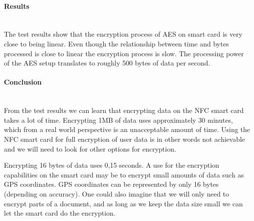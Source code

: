\paragraph{Results}\mbox{}\\



The test results show that the encryption process of AES on smart card is very close to being linear. Even though the relationship between time and bytes processed is close to linear the encryption process is slow. The processing power of the AES setup translates to roughly 500 bytes of data per second.


\paragraph{Conclusion}\mbox{}\\
From the test results we can learn that encrypting data on the NFC smart card takes a lot of time. Encrypting 1MB of data uses approximately 30 minutes, which from a real world perspective is an unacceptable amount of time. Using the NFC smart card for full encryption of user data is in other words not achievable and we will need to look for other options for encryption.

Encrypting 16 bytes of data uses 0,15 seconds. A use for the encryption capabilities on the smart card may be to encrypt small amounts of data such as GPS coordinates. GPS coordinates can be represented by only 16 bytes (depending on accuracy). One could also imagine that we will only need to encrypt parts of a document, and as long as we keep the data size small we can let the smart card do the encryption.
